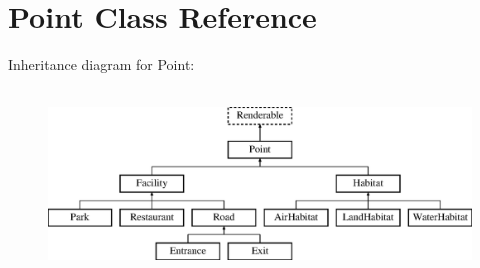 \hypertarget{class_point}{}\section{Point Class Reference}
\label{class_point}
Inheritance diagram for Point\+:\begin{figure}[H]
\begin{center}
\leavevmode
\includegraphics[height=5.000000cm]{class_point}
\end{center}
\end{figure}
